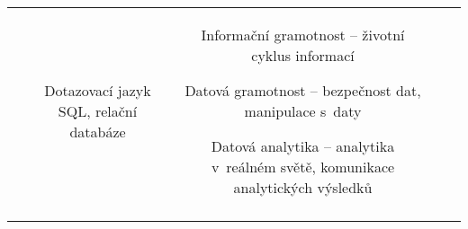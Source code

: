 \begin{landscape}
\begin{table}[htbp]
{\begin{tabularx}{\linewidth}{CCCCC}
&

Dotazovací jazyk SQL, relační databáze

&

Informační gramotnost – životní cyklus informací

Datová gramotnost – bezpečnost dat, manipulace s~daty

Datová analytika – analytika v~reálném světě, komunikace analytických výsledků 

\\

\tabularnewline
\bottomrule
\end{tabularx}

}

\end{table}

\end{landscape}